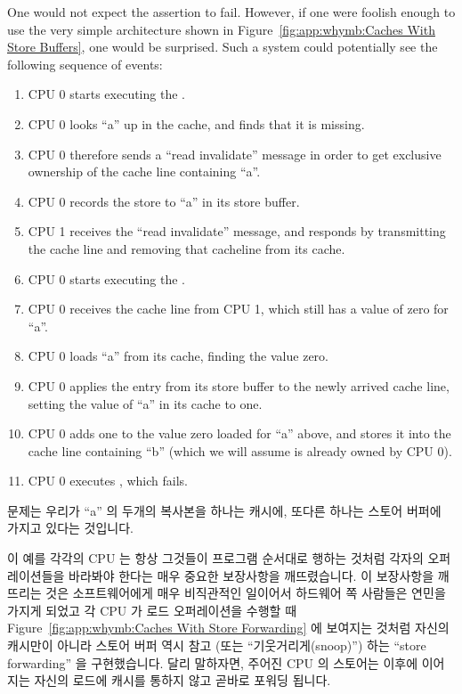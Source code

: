 One would not expect the assertion to fail.
However, if one were foolish enough to use the very simple architecture
shown in
Figure~\ref{fig:app:whymb:Caches With Store Buffers},
one would be surprised.
Such a system could potentially see the following sequence of events:
\begin{enumerate}
\item	CPU 0 starts executing the .
\item	CPU 0 looks ``a'' up in the cache, and finds that it is missing.
\item	CPU 0 therefore sends a ``read invalidate'' message in order to
	get exclusive ownership of the cache line containing ``a''.
\item	CPU 0 records the store to ``a'' in its store buffer.
\item	CPU 1 receives the ``read invalidate'' message, and responds
	by transmitting the cache line and removing that cacheline from
	its cache.
\item	CPU 0 starts executing the .
\item	CPU 0 receives the cache line from CPU 1, which still has
	a value of zero for ``a''.
\item	CPU 0 loads ``a'' from its cache, finding the value zero.
	\label{item:app:whymb:Need Store Buffer}
\item	CPU 0 applies the entry from its store buffer to the newly
	arrived cache line, setting the value of ``a'' in its cache
	to one.
\item	CPU 0 adds one to the value zero loaded for ``a'' above,
	and stores it into the cache line containing ``b''
	(which we will assume is already owned by CPU 0).
\item	CPU 0 executes , which fails.
\end{enumerate}
\fi

문제는 우리가 ``a'' 의 두개의 복사본을 하나는 캐시에, 또다른 하나는 스토어
버퍼에 가지고 있다는 것입니다.

이 예를 각각의 CPU 는 항상 그것들이 프로그램 순서대로 행하는 것처럼 각자의
오퍼레이션들을 바라봐야 한다는 매우 중요한 보장사항을 깨뜨렸습니다.
이 보장사항을 깨뜨리는 것은 소프트웨어에게 매우 비직관적인 일이어서 하드웨어 쪽
사람들은 연민을 가지게 되었고 각 CPU 가 로드 오퍼레이션을 수행할 때
Figure~\ref{fig:app:whymb:Caches With Store Forwarding} 에 보여지는 것처럼
자신의 캐시만이 아니라 스토어 버퍼 역시 참고 (또는 ``기웃거리게(snoop)'') 하는
``store forwarding'' 을 구현했습니다.
달리 말하자면, 주어진 CPU 의 스토어는 이후에 이어지는 자신의 로드에 캐시를
통하지 않고 곧바로 포워딩 됩니다.
\iffalse

